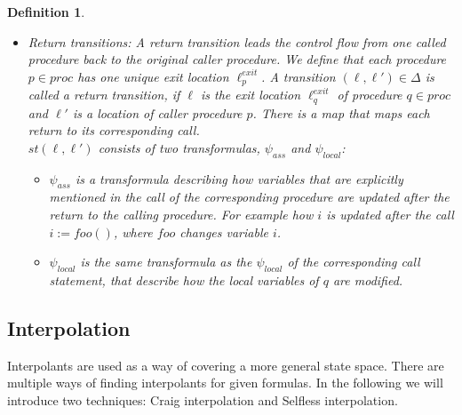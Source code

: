 \documentclass{article}
\newtheorem{mydef}{Definition}
\newcommand\mycom[1]{}
\newcommand\mycom[1]{#1}
\newcommand{\jw}[1]{\mycom{\todo[color=blue!40,inline]{\small JW: #1}}}
\begin{document}
\begin{mydef}
\begin{itemize}
			\item Return transitions: A return transition leads the control flow from one called procedure back to the original caller procedure. We define that each procedure $p \in proc$ has one unique exit location $\ell^{exit}_p$. A transition $(\ell, \ell') \in \Delta$ is called a return transition, if $\ell$ is the exit location $\ell_q^{exit}$ of procedure $q \in proc$ and $\ell'$ is a location of caller procedure $p$. There is a map that maps each return to its corresponding call. \\
			$st(\ell, \ell')$ consists of two transformulas, $\psi_{ass}$ and $\psi_{local}$: 
			\begin{itemize}
				\item $\psi_{ass}$ is a transformula describing how variables that are explicitly mentioned in the call of the corresponding procedure are updated after the return to the calling procedure. For example how $i$ is updated after the call $i := foo()$, where $foo$ changes variable $i$.
				\item $\psi_{local}$ is the same transformula as the $\psi_{local}$ of the corresponding call statement, that describe how the local variables of $q$ are modified.
			\end{itemize}
		\end{itemize}
	\end{mydef}

	\jw{If we have those TFs for procedures we do not have to look at the internal transitions of the procedure itself? \\ Can we concatenate these formulas like above? \\ Aren't these formulas acting like summaries of the procedure? \\ How are these formulas used in the context of the calling procedure? \\
	Do we need $\psi_{local}$ at all, we are not interested in local variable changes in a called procedure?}
	
	\jw{ToDo ICFG elaborate ICFG example}
	
	\pagebreak
		
	\subsection{Interpolation}
	Interpolants are used as a way of covering a more general state space. There are multiple ways of finding interpolants for given formulas.
	In the following we will introduce two techniques: Craig interpolation and Selfless interpolation. 
	\jw{citation needed}
	
\end{document}

